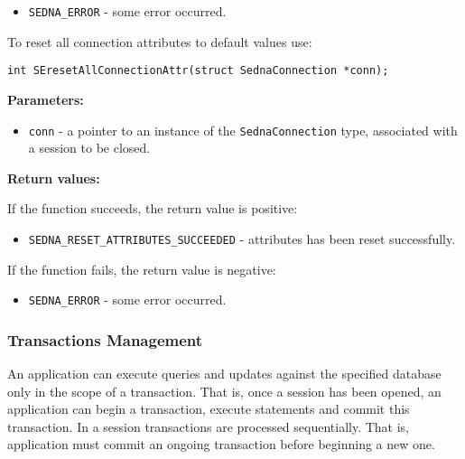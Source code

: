 \documentclass[a4paper,12pt]{article}
\newenvironment{citemize}
{\begin{itemize}
  \setlength{\itemsep}{0pt}
  \setlength{\parskip}{0pt}
  \setlength{\parsep}{0pt}}
{\end{itemize}}
\begin{document}
\begin{citemize}
\item\verb!SEDNA_ERROR! - some error occurred.
\end{citemize}

To reset all connection attributes to default values use:

\begin{verbatim}
int SEresetAllConnectionAttr(struct SednaConnection *conn);
\end{verbatim}

\noindent
\textbf{Parameters:}

\begin{citemize}
\item\verb!conn! - a pointer to an instance of the \verb!SednaConnection! type,
associated with a session to be closed.
\end{citemize}

\noindent
\textbf{Return values:}

\medskip

\noindent
If the function succeeds, the return value is positive:

\begin{citemize}
\item\verb!SEDNA_RESET_ATTRIBUTES_SUCCEEDED! - attributes has been reset
successfully.
\end{citemize}

\noindent
If the function fails, the return value is negative:

\begin{citemize}
\item\verb!SEDNA_ERROR! - some error occurred.
\end{citemize}


\subsubsection{Transactions Management}
An application can execute queries and updates against the specified database
only in the scope of a transaction. That is, once a session has been opened, an
application can begin a transaction, execute statements and commit this
transaction. In a session transactions are processed sequentially. That is,
application must commit an ongoing transaction before beginning a new one.
\end{document}
